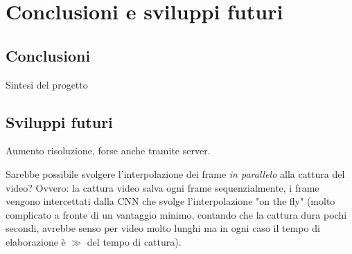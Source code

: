 \chapter{Conclusioni e sviluppi futuri}

\section{Conclusioni}

Sintesi del progetto

\section{Sviluppi futuri}
\label{sec:sviluppi-futuri}

Aumento risoluzione, forse anche tramite server.

Sarebbe possibile svolgere l'interpolazione dei frame \emph{in parallelo} alla cattura del video?
Ovvero: la cattura video salva ogni frame sequenzialmente, i frame vengono intercettati dalla CNN che svolge 
l'interpolazione "on the fly" (molto complicato a fronte di un vantaggio minimo, contando che la cattura dura 
pochi secondi, avrebbe senso per video molto lunghi ma in ogni caso il tempo di elaborazione è $\gg$ del tempo di cattura).